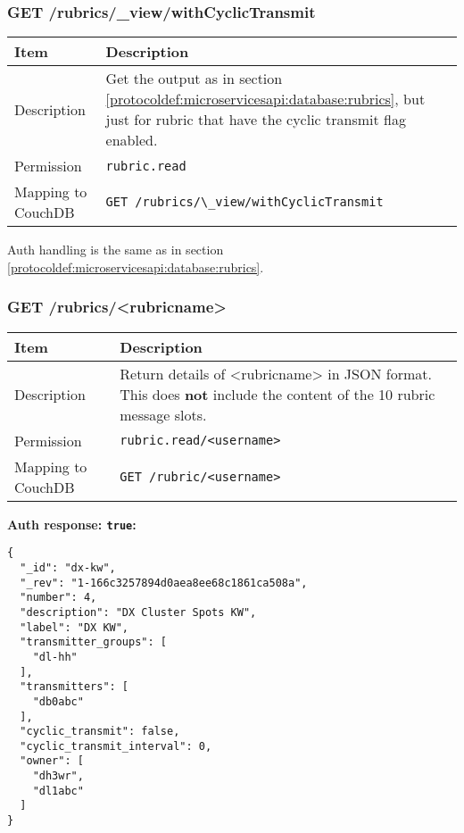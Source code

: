 \subsubsection{GET /rubrics/\_view/withCyclicTransmit}
\begin{table}[htbp]
  \begin{tabular}{|l|p{12cm}|} \hline
    Item               & Description  \\ \hline \hline
    Description        & Get the output as in section \ref{protocoldef:microservicesapi:database:rubrics}, but just for rubric that have the cyclic transmit flag enabled. \\ \hline
    Permission         & \verb|rubric.read| \\ \hline
    Mapping to CouchDB & \verb|GET /rubrics/\_view/withCyclicTransmit| \\ \hline
  \end{tabular}
\end{table}
Auth handling is the same as in section \ref{protocoldef:microservicesapi:database:rubrics}.

\newpage
\subsubsection{GET /rubrics/<rubricname>}
\label{protocoldef:microservicesapi:database:getrubrics/rubricname}
\begin{table}[htbp]
  \begin{tabular}{|l|p{12cm}|} \hline
    Item               & Description  \\ \hline \hline
    Description        & Return details of <rubricname> in JSON format. This does \textbf{not} include the content of the 10 rubric message slots. \\ \hline
    Permission         & \verb|rubric.read/<username>| \\ \hline
    Mapping to CouchDB & \verb|GET /rubric/<username>| \\ \hline
  \end{tabular}
\end{table}

\textbf{Auth response: \texttt{true}:}\\
\begin{lstlisting}
{
  "_id": "dx-kw",
  "_rev": "1-166c3257894d0aea8ee68c1861ca508a",
  "number": 4,
  "description": "DX Cluster Spots KW",
  "label": "DX KW",
  "transmitter_groups": [
    "dl-hh"
  ],
  "transmitters": [
    "db0abc"
  ],
  "cyclic_transmit": false,
  "cyclic_transmit_interval": 0,
  "owner": [
    "dh3wr",
    "dl1abc"
  ]
}
\end{lstlisting}


